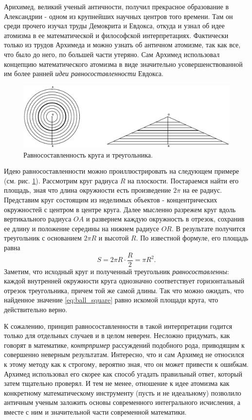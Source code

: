 Арихимед, великий ученый античности, получил прекрасное образование в Александрии - одном из крупнейших научных центров того времени. 
Там он среди прочего изучал труды Демокрита и Евдокса, откуда и узнал об идее атомизма в ее математической и философской интерпретациях.
Фактически только из трудов Архимеда и можно узнать об античном атомизме, так как все, что было до него, по большей части утеряно.
Сам Архимед использовал концепцию математического атомизма в виде значительно усовершенствованной им более ранней \textit{идеи равносоставленности} Евдокса.

\begin{figure}[t!]
   \centering
   \includegraphics[scale=0.44]{images/archimed_1}
   \caption{Равносоставленность круга и треугольника.}
   \label{fig:archimed_1}
\end{figure}

Идею равносоставленности можно проиллюстрировать на следующем примере (см. рис. \ref{fig:archimed_1}).
Рассмотрим круг радиуса $R$ на плоскости.
Постараемся найти его площадь, зная что длина окружности есть произведение $2\pi$ на ее радиус.
Представим круг состоящим из неделимых объектов - концентрических окружностей с центром в центре круга.
Далее мысленно разрежем круг вдоль вертикального радиуса $OA$ и развернем каждую окружность в отрезок, сохранив ее длину и положение середины на нижнем радиусе $OR$.
В результате получится треугольник с основанием $2\pi R$ и высотой $R$.
По известной формуле, его площадь равна
\begin{equation}\label{eq:ball_square}
S = 2\pi R\cdot\frac{R}{2} = \pi R^2.
\end{equation}
Заметим, что исходный круг и полученный треугольник \textit{равносоставленны}: каждой внутренней окружности круга однозначно соответствует горизонтальный отрезок треугольника, причем той же самой длины.
Так что можно ожидать, что найденное значение \ref{eq:ball_square} равно искомой площади круга, что действительно верно.

К сожалению, принцип равносоставленности в такой интерпретации годится только для отдельных случаев и в целом неверен. 
Несложно придумать, как говорят в математике, \textit{контрпример} рассуждений подобного рода, приводящим к совершенно неверным результатам.
Интересно, что и сам Архимед не относился к этому методу как к строгому, вероятно зная, что он может привести к ошибкам.
Архимед использовал его скорее как способ угадать правильный ответ, который затем тщательно проверял.
И тем не менее, отношение к идее атомизма как конкретному математическому инструменту (пусть и не идеальному) позволило античным ученым заложить основы современного интегрального исчисления, а вместе с ним и значительной части современной математики.

